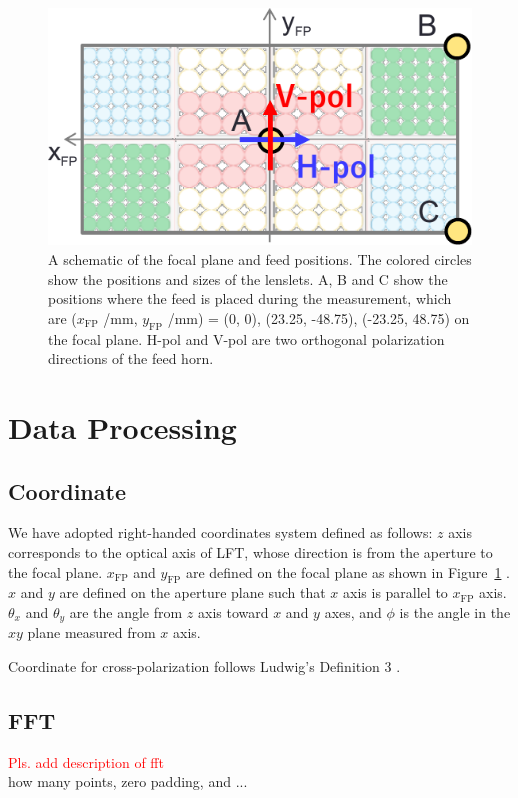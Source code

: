 \documentclass[journal]{IEEEtran}
\newcommand{\red}[1]{\textcolor{red}{#1}}
\begin{document}
\begin{figure}[!t]
\centering
\includegraphics[width=0.8\linewidth]{Figures/FeedPos.pdf}
\caption{A schematic of the focal plane and feed positions. The colored circles show the positions and sizes of the lenslets. A, B and C show the positions where the feed is placed during the measurement, which are ($x_\mathrm{FP}$ /mm, $y_\mathrm{FP}$ /mm) = (0, 0), (23.25, -48.75), (-23.25, 48.75) on the focal plane. H-pol and V-pol are two orthogonal polarization directions of the feed horn.}
\label{fig:FeedPos}
\end{figure}
%
%
\section{Data Processing}
%
\subsection{Coordinate}
\par
We have adopted right-handed coordinates system defined as follows: $z$ axis corresponds to the optical axis of LFT, whose direction is from the aperture to the focal plane. $x_\mathrm{FP}$ and $y_\mathrm{FP}$ are defined on the focal plane as shown in Figure~\ref{fig:FeedPos} . $x$ and $y$ are defined on the aperture plane such that $x$ axis is parallel to $x_\mathrm{FP}$ axis. $\theta_x$ and $\theta_y$ are the angle from $z$ axis toward $x$ and $y$ axes, and $\phi$ is the angle in the $xy$ plane measured from $x$ axis.
\par
Coordinate for cross-polarization follows Ludwig's Definition 3 \cite{Ludwig1973}.
%
\subsection{FFT}
\red{Pls. add description of fft} \\
how many points, zero padding, and ...
\end{document}
